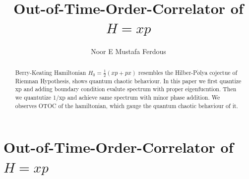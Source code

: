 \documentclass[12pt, letterpaper]{article}
\title{\Huge{Out-of-Time-Order-Correlator of $H=xp$}}
\author{Noor E Mustafa Ferdous}
\newcommand*{\1}{\hspace{1pt}}
\begin{document}
    
    \maketitle
    \newpage
    \section*{Out-of-Time-Order-Correlator of $H=xp$}
    
    \begin{abstract}
        Berry-Keating Hamiltonian $H_{0}=\frac{1}{2}(xp+px)$ resembles the Hilber-P$\acute{o}$lya 
        cojectue of Riemnan Hypothesis, shows quantum chaotic behaviour. In this paper we first 
        quantize xp and adding boundary condition evalute spectrum with proper eigenfucntion.
        Then we quantutize 1/xp and achieve same spectrum with minor phase addition. We observes
        OTOC of the hamiltonian, which gauge the quantum chaotic behaviour of it.
    \end{abstract}

    \newpage

    \tableofcontents
\end{document}
